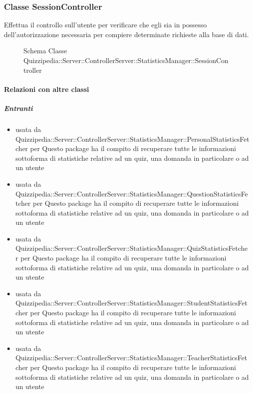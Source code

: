 \subsubsection{Classe SessionController}
Effettua il controllo sull'utente per verificare che egli sia in possesso dell'autorizzazione necessaria per compiere determinate richieste alla base di dati.
\begin{figure}[H]
\centering
\noindent{}
\caption[Schema Classe SessionController]{Schema Classe Quizzipedia::Server::ControllerServer::StatisticsManager::SessionController}
\end{figure}
\paragraph{Relazioni con altre classi}
\subparagraph{Entranti}
\begin{itemize}
\item usata da Quizzipedia::Server::ControllerServer::StatisticsManager::PersonalStatisticsFetcher per Questo package ha il compito di recuperare tutte le informazioni sottoforma di statistiche relative ad un quiz, una domanda in particolare o ad un utente
\item usata da Quizzipedia::Server::ControllerServer::StatisticsManager::QuestionStatisticsFetcher per Questo package ha il compito di recuperare tutte le informazioni sottoforma di statistiche relative ad un quiz, una domanda in particolare o ad un utente
\item usata da Quizzipedia::Server::ControllerServer::StatisticsManager::QuizStatisticsFetcher per Questo package ha il compito di recuperare tutte le informazioni sottoforma di statistiche relative ad un quiz, una domanda in particolare o ad un utente
\item usata da Quizzipedia::Server::ControllerServer::StatisticsManager::StudentStatisticsFetcher per Questo package ha il compito di recuperare tutte le informazioni sottoforma di statistiche relative ad un quiz, una domanda in particolare o ad un utente
\item usata da Quizzipedia::Server::ControllerServer::StatisticsManager::TeacherStatisticsFetcher per Questo package ha il compito di recuperare tutte le informazioni sottoforma di statistiche relative ad un quiz, una domanda in particolare o ad un utente
\end{itemize}
